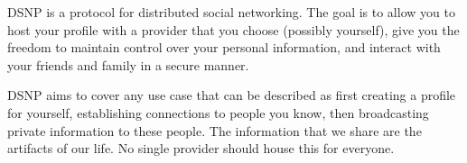 \documentclass[letterpaper,11pt,oneside]{article}
\begin{document}
%
%
%
%
% 


DSNP is a protocol for distributed social networking. The goal is to allow you
to host your profile with a provider that you choose (possibly yourself), give
you the freedom to maintain control over your personal information, and
interact with your friends and family in a secure manner.

DSNP aims to cover any use case that can be described as first creating a
profile for yourself, establishing connections to people you know, then
broadcasting private information to these people. The information that we share
are the artifacts of our life. No single provider should house this for
everyone.
\end{document}
